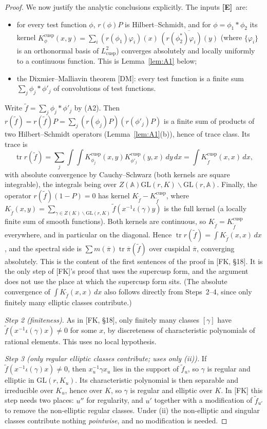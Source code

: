 \documentclass[12pt]{article}
\newcommand{\ov}[1]{\overline{#1}}
\newcommand{\A}{\mathbb{A}}
\newcommand{\tr}{\operatorname{tr}}
\newcommand{\GL}{\mathrm{GL}}
\newcommand{\pib}{\ov{\pi}}
\newcommand{\Ev}{\textbf{[E]}}
\theoremstyle{plain}
\theoremstyle{definition}
\begin{document}
\begin{proof}
We now justify the analytic conclusions explicitly. The inputs \Ev\ are:
\begin{itemize}
\item[(A1)] for every test function $\phi$, $r(\phi)P$ is Hilbert--Schmidt, and for $\phi=\phi_1*\phi_2$ its kernel $K^{\mathrm{cusp}}_\phi(x,y)=\sum_i(r(\phi_1)\varphi_i)(x)\,\ov{(r(\phi_2^*)\varphi_i)(y)}$ (where $\{\varphi_i\}$ is an orthonormal basis of $L^2_{\mathrm{cusp}}$) converges absolutely and locally uniformly to a continuous function. This is Lemma~\ref{lem:A1} below;
\item[(A2)] the Dixmier--Malliavin theorem [DM]: every test function is a finite sum $\sum_j\phi_j*\phi'_j$ of convolutions of test functions.
\end{itemize}
Write $\tilde f=\sum_j\phi_j*\phi'_j$ by (A2). Then $r(\tilde f)=r(\tilde f)P=\sum_j(r(\phi_j)P)(r(\phi'_j)P)$ is a finite sum of products of two Hilbert--Schmidt operators (Lemma~\ref{lem:A1}(b)), hence of trace class. Its trace is
\[ \tr r(\tilde f)=\sum_j\int\!\!\int K^{\mathrm{cusp}}_{\phi_j}(x,y)K^{\mathrm{cusp}}_{\phi'_j}(y,x)\,dy\,dx=\int K^{\mathrm{cusp}}_{\tilde f}(x,x)\,dx, \]
with absolute convergence by Cauchy--Schwarz (both kernels are square integrable), the integrals being over $Z(\A)\GL(r,K)\backslash\GL(r,\A)$. Finally, the operator $r(\tilde f)(1-P)=0$ has kernel $K_{\tilde f}-K^{\mathrm{cusp}}_{\tilde f}$, where $K_{\tilde f}(x,y)=\sum_{\gamma\in Z(K)\backslash\GL(r,K)}\tilde f(x^{-1}\iota(\gamma)y)$ is the full kernel (a locally finite sum of smooth functions). Both kernels are continuous, so $K_{\tilde f}=K^{\mathrm{cusp}}_{\tilde f}$ everywhere, and in particular on the diagonal. Hence $\tr r(\tilde f)=\int K_{\tilde f}(x,x)\,dx$, and the spectral side is $\sum m(\pib)\tr\pib(\tilde f)$ over cuspidal $\pib$, converging absolutely. This is the content of the first sentences of the proof in [FK, \S18]. It is the only step of [FK]'s proof that uses the supercusp form, and the argument does not use the place at which the supercusp form sits. (The absolute convergence of $\int K_{\tilde f}(x,x)\,dx$ also follows directly from Steps~2--4, since only finitely many elliptic classes contribute.)

\emph{Step 2 (finiteness).} As in [FK, \S18], only finitely many classes $[\gamma]$ have $\tilde f(x^{-1}\iota(\gamma)x)\neq0$ for some $x$, by discreteness of characteristic polynomials of rational elements. This uses no local hypothesis.

\emph{Step 3 (only regular elliptic classes contribute; uses only (ii)).} If $\tilde f(x^{-1}\iota(\gamma)x)\ne0$, then $x_u^{-1}\gamma x_u$ lies in the support of $\tilde f_u$, so $\gamma$ is regular and elliptic in $\GL(r,K_u)$. Its characteristic polynomial is then separable and irreducible over $K_u$, hence over $K$, so $\gamma$ is regular and elliptic over $K$. In [FK] this step needs two places: $u''$ for regularity, and $u'$ together with a modification of $\tilde f_{u'}$ to remove the non-elliptic regular classes. Under (ii) the non-elliptic and singular classes contribute nothing \emph{pointwise}, and no modification is needed.


\end{proof}
\end{document}

